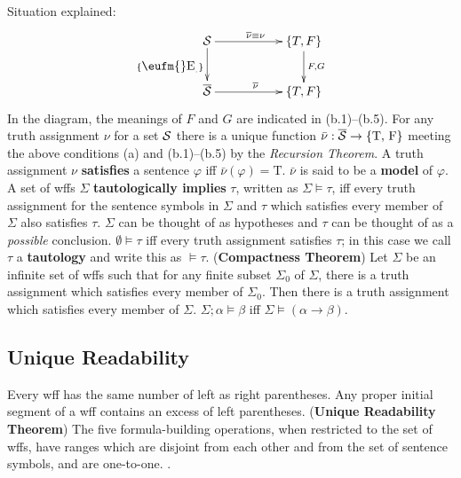 \documentclass{myproc}
\def\EE{\mbox{\eufm{}E}}
\begin{document}
		\een
	\een
\w Situation explained:
			\[ \xymatrix{
				{\cal{}S} \ar[d]_{\{\EE_\cdot\}} 
				\ar[rr]^{\overline{\nu} \equiv \nu}  
					& &  \{T, F\}
					\ar[d]^{F,G} \\
				\overline{\cal{}S} 
				\ar[rr]^{\overline{\nu}} & & \{T, F\}
			}\]
	\bit
	\w In the diagram, the meanings of 
		$F$ and $G$ are indicated in (b.1)--(b.5).
	\eit
\w For any truth assignment $\nu$ for a set $\cal{}S$ there is a unique
	function $\bar{\nu}: \overline{\cal{}S} \rightarrow \{\mbox{T, F}\}$
	meeting the above conditions (a) and (b.1)--(b.5) by the
	{\em{}Recursion Theorem\/}.
\w A truth assignment $\nu$ {\bf{}satisfies} a sentence 
	$\varphi$ iff $\bar\nu(\varphi) = \mbox{T}$.
	\bit
	\w $\bar{\nu}$ is said to be a {\bf{}model} of $\varphi$.
	\eit
\w A set of wffs $\Sigma$ {\bf{}tautologically implies} $\tau$, written as
	$\Sigma \models \tau$, iff every truth assignment
	for the sentence symbols in $\Sigma$ and $\tau$ which
	satisfies every member of $\Sigma$ also satisfies $\tau$.
	\bit
	\w $\Sigma$ can be thought of as hypotheses and $\tau$
		can be thought of as a {\em{}possible\/} conclusion.
	\w $\emptyset \models \tau$ iff every truth assignment 
		satisfies $\tau$; in this case we call $\tau$
		a {\bf{}tautology} and write this as $\models \tau$.
	\eit
\w ({\bf{}Compactness Theorem})
	Let $\Sigma$ be an infinite set of wffs such that for any 
	finite subset $\Sigma_0$ of $\Sigma$, there is a truth
	assignment which satisfies every member of $\Sigma_0$.
	Then there is a truth assignment which satisfies every
	member of $\Sigma$.
\w $\Sigma; \alpha \models \beta$ iff $\Sigma \models (\alpha
	\rightarrow \beta)$.
\eit

\subsection{Unique Readability}
\bit
\w Every wff has the same number of left as right parentheses.
\w Any proper initial segment of a wff contains an excess of
	left parentheses.
\w ({\bf{}Unique Readability Theorem})
	The five formula-building operations, when restricted
	to the set of wffs, 
	\ben
	\w [(a)] have ranges which are disjoint from each other and
		from the set of sentence symbols, and
	\w [(b)] are one-to-one.
	\een
{}.
\eit
\end{document}
